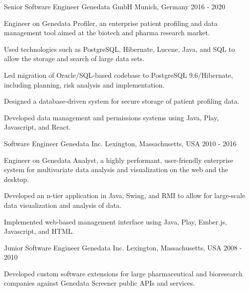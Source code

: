 \begin{cventries}
  \cventry
  {Senior Software Engineer} %
  {Genedata GmbH} %
  {Munich, Germany} %
  {2016 - 2020} %
  {
    \begin{cvitems} %
      \item {Engineer on Genedata Profiler, an enterprise patient profiling and data management tool aimed at the biotech and pharma research market.}
      \item {Used technologies such as PostgreSQL, Hibernate, Lucene, Java, and SQL to allow the storage and search of large data sets.}
      \item {Led migration of Oracle/SQL-based codebase to PostgreSQL 9.6/Hibernate, including planning, risk analysis and implementation.}
      \item {Designed a database-driven system for secure storage of patient profiling data.}
      \item {Developed data management and permissions systems using Java, Play, Javascript, and React.}
    \end{cvitems}
  }

\cventry
{Software Engineer} %
{Genedata Inc.} %
{Lexington, Massachusetts, USA} %
{2010 - 2016} %
{
  \begin{cvitems} %
    \item {Engineer on Genedata Analyst, a highly performant, user-friendly enterprise system for multivariate data analysis and visualization on the web and the desktop.}
    \item {Developed an n-tier application in Java, Swing, and RMI to allow for large-scale data visualization and analysis of data.}
    \item {Implemented web-based management interface using Java, Play, Ember.js, Javascript, and HTML.}
  \end{cvitems}
}

\cventry
{Junior Software Engineer} %
{Genedata Inc.} %
{Lexington, Massachusetts, USA} %
{2008 - 2010} %
{
  \begin{cvitems} %
    \item {Developed custom software extensions for large pharmaceutical and bioresearch companies against Genedata Screener public APIs and services.}
  \end{cvitems}
}


\end{cventries}

